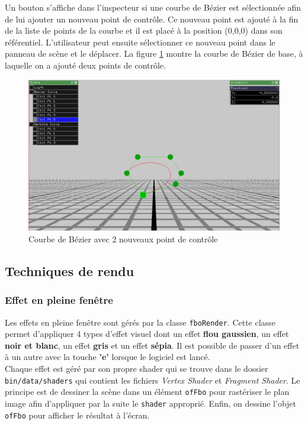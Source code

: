Un bouton s'affiche dans l'inspecteur si une courbe de Bézier est sélectionnée afin de lui ajouter un nouveau point de contrôle.
Ce nouveau point est ajouté à la fin de la liste de points de la courbe et il est placé à la position (0,0,0) dans son référentiel.
L'utilisateur peut ensuite sélectionner ce nouveau point dans le panneau de scène et le déplacer.
La figure \ref{fig:courbe_bezier3} montre la courbe de Bézier de base, à laquelle on a ajouté deux points de contrôle.

\begin{figure}[H]
    \centering
	\includegraphics[scale=0.4]{fig/bezier3.png}
	\caption{Courbe de Bézier avec 2 nouveaux point de contrôle}
	\label{fig:courbe_bezier3}
\end{figure}


\subsection{Techniques de rendu}
\subsubsection{Effet en pleine fenêtre}
\label{s:effect}
Les effets en pleine fenêtre sont gérés par la classe \texttt{fboRender}. Cette classe permet d'appliquer 4 types d'effet visuel dont un effet \textbf{flou gaussien}, un effet \textbf{noir et blanc}, un effet \textbf{gris} et un effet \textbf{sépia}. Il est possible de passer d'un effet à un autre avec la touche \textbf{'e'} lorsque le logiciel est lancé. \\

Chaque effet est géré par son propre shader qui se trouve dans le dossier \texttt{bin/data/shaders} qui contient les fichiers \textit{Vertex Shader} et \textit{Fragment Shader}. Le principe est de dessiner la scène dans un élément \texttt{ofFbo} pour rastériser le plan image afin d'appliquer par la suite le \texttt{shader} approprié. Enfin, on dessine l'objet \texttt{ofFbo} pour afficher le résultat à l'écran.

